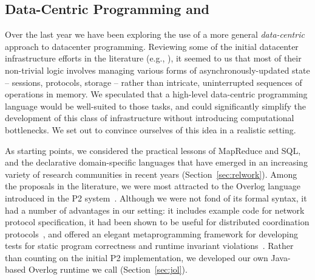 \documentclass{sig-alternate}
\newcommand{\jmh}[1]{{\textcolor{red}{#1 -- jmh}}}
\begin{document}
% 
% 

\subsection{Data-Centric Programming and \BOOM}
Over the last year we have been exploring the use of a more general {\em data-centric} approach to datacenter programming. Reviewing some of the initial datacenter infrastructure efforts in the literature (e.g., \cite{mapreduce-osdi,gfs,chubby,dynamo}), it seemed to us that most of their non-trivial logic involves managing various forms of asynchronously-updated state -- sessions, protocols, storage -- rather than intricate, uninterrupted sequences of operations in memory.  We speculated that a high-level data-centric programming language would be well-suited to those tasks, and could significantly simplify the development of this class of infrastructure without introducing computational bottlenecks.  We set out to convince ourselves of this idea in a realistic setting.

As starting points, we considered the practical lessons of MapReduce and SQL, and the declarative domain-specific languages that have emerged in an increasing variety of research communities in recent years (Section~\ref{sec:relwork}).  
Among the proposals in the literature, we were most attracted to the Overlog language introduced in the P2 system~\cite{p2}.  Although we were not fond of its formal syntax, it had a number of advantages in our setting: it includes example code for network protocol specification, it had been shown to be useful for distributed coordination protocols~\cite{paxonp2}, and offered an elegant metaprogramming framework for developing tests for static program correctness and runtime invariant violations~\cite{evitaraced}.  Rather than counting on the initial P2 implementation, we developed our own Java-based Overlog runtime we call {\em \JOL} (Section~\ref{sec:jol}).
\end{document}
